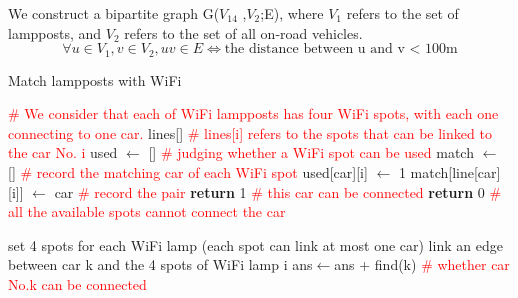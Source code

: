 \documentclass[12pt]{article}
\theoremstyle{definition}
\theoremstyle{remark}
\numberwithin{equation}{section}
\begin{document}
	We construct a bipartite graph G($V_14$ ,$V_2$;E)​, where $V_1$ refers to the set of lampposts, and $V_2$ refers to the set of all on-road vehicles. 
	$$\forall u\in V_1,v\in V_2, uv\in E\Leftrightarrow \text{the distance between u and v < 100m}$$
		\begin{algorithm}
		\caption{Match lampposts with WiFi}
		\label{type}
		\begin{algorithmic}
			\STATE \textcolor{red}{\# We consider that each of WiFi lampposts has four WiFi spots, with each one connecting to one car.}
			\STATE lines[] \textcolor{red}{\# lines[i] refers to the spots that can be linked to the car No. i}
			\STATE used $\leftarrow$ [] \textcolor{red}{\# judging whether a WiFi spot can be used}
			\STATE match $\leftarrow$ [] \textcolor{red}{\# record the matching car of each WiFi spot}
			\def \update{find(car): \textcolor{red}{\# judge whether a car can be connected (Hungarian algorithm)}}
			\STATE used[car][i] $\leftarrow$ 1
			\STATE match[line[car][i]] $\leftarrow$ car \textcolor{red}{\# record the pair}
			\STATE \textbf{return} 1\textcolor{red}{ \# this car can be connected}
			\ENDIF
			\ENDIF
			\ENDFOR
			\STATE \textbf{return} 0 \textcolor{red}{\# all the available spots cannot connect the car}
			
			\STATE set 4 spots for each WiFi lamp (each spot can link at most one car)
			\STATE link an edge between car k and the 4 spots of WiFi lamp i 
			\ENDIF
			\ENDFOR
			\ENDFOR
			\ENDWHILE
			\STATE ans$\leftarrow$ans + find(k) \textcolor{red}{\# whether car No.k can be connected}
			\ENDFOR
		\end{algorithmic}
	\end{algorithm}
	
\end{document}
